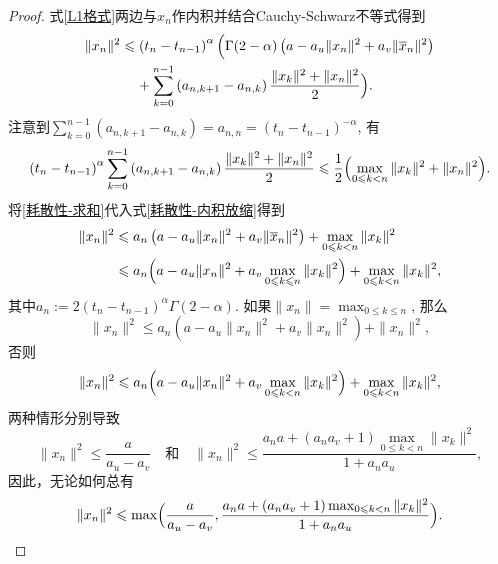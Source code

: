 \begin{proof}
    式\eqref{L1格式}两边与$x_n$作内积并结合Cauchy-Schwarz不等式得到
    \begin{equation}\label{耗散性-内积放缩}
        \begin{aligned}
            \|x_n\|^2&\leqslant \left(t_n-t_{n-1}\right)^\alpha \Bigl( \Gamma(2-\alpha) \left(a-a_u \|x_n\|^2 + a_v \|\overline x_n\|^2\right)
            \\ &\relphantom{\leqslant} + \sum_{k=0}^{n-1} \left(a_{n,k+1}-a_{n,k}\right) \frac{\|x_k\|^2+\|x_n\|^2}{2}\Bigr).
        \end{aligned}
    \end{equation}
    注意到$\sum_{k=0}^{n-1} \left(a_{n,k+1}-a_{n,k}\right)=a_{n,n}=\left(t_n-t_{n-1}\right)^{-\alpha}$, 有
    \begin{equation}\label{耗散性-求和}
        \left(t_n-t_{n-1}\right)^\alpha \sum_{k=0}^{n-1} \left(a_{n,k+1}-a_{n,k}\right) \frac{\|x_k\|^2+\|x_n\|^2}{2}\leqslant\frac{1}{2}\Bigl(\max_{0\leqslant k<n} \|x_k\|^2 + \|x_n\|^2\Bigr).
    \end{equation}
    将\eqref{耗散性-求和}代入式\eqref{耗散性-内积放缩}得到
    \begin{align*}
        \|x_n\|^2 &\leqslant a_n \left(a-a_u \|x_n\|^2 + a_v \|\overline x_n\|^2\right) + \max_{0\leqslant k<n} \|x_k\|^2
        \\ &\leqslant a_n \Bigl(a-a_u \|x_n\|^2 + a_v \max_{0\leqslant k\leqslant n} \|x_k\|^2\Bigr) + \max_{0\leqslant k<n} \|x_k\|^2,
    \end{align*}
    其中$a_n:=2\left(t_n-t_{n-1}\right)^\alpha \Gamma(2-\alpha)$. 如果$\|x_n\|=\max_{0\leqslant k\leqslant n}$, 那么
    \begin{equation}
        \|x_n\|^2 \leqslant a_n \left(a-a_u \|x_n\|^2 + a_v \|x_n\|^2\right) + \|x_n\|^2,
    \end{equation}
    否则
    \begin{equation}
        \|x_n\|^2 \leqslant a_n \Bigl(a-a_u \|x_n\|^2 + a_v \max_{0\leqslant k< n} \|x_k\|^2\Bigr) + \max_{0\leqslant k< n} \|x_k\|^2,
    \end{equation}    
    两种情形分别导致
    \begin{equation*}
        \|x_n\|^2 \leqslant \frac{a}{a_u-a_v} \quad \text{和} \quad \|x_n\|^2 \leqslant \frac{a_na+\left(a_na_v+1\right)\max_{0\leqslant k<n}\|x_k\|^2}{1+a_na_u},
    \end{equation*}
    因此，无论如何总有
    \begin{equation*}
        \|x_n\|^2\leqslant \max\Bigl(\frac{a}{a_u-a_v}, \frac{a_na+\left(a_na_v+1\right)\max_{0\leqslant k<n}\|x_k\|^2}{1+a_na_u}\Bigr).

\end{equation*}
\end{proof}
